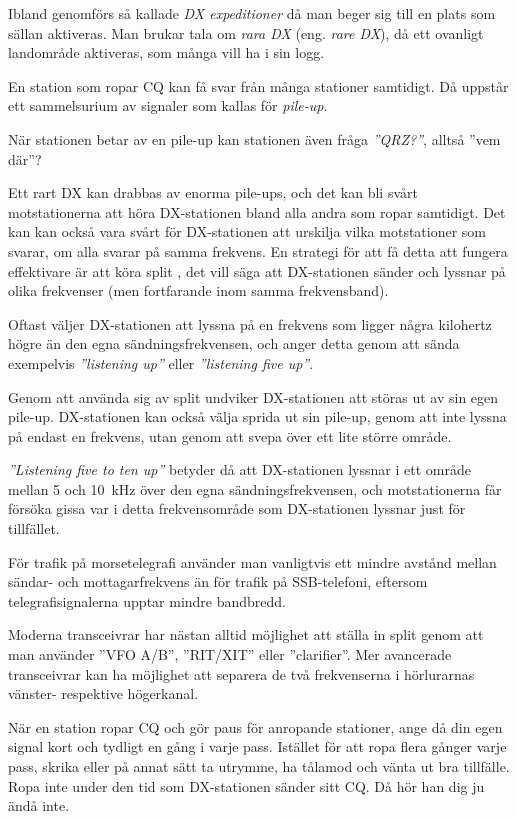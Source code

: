Ibland genomförs så kallade \emph{DX expeditioner} då man beger sig till en
plats som sällan aktiveras.
Man brukar tala om \emph{rara DX} (eng. \emph{rare DX}), då ett ovanligt
landområde aktiveras, som många vill ha i sin logg.

En station som ropar CQ kan få svar från många stationer samtidigt.
Då uppstår ett sammelsurium av signaler som kallas för \emph{pile-up}.

När stationen betar av en pile-up kan stationen även fråga \emph{''QRZ?''},
alltså ''vem där''?

Ett rart DX kan drabbas av enorma pile-ups, och det kan bli svårt
motstationerna att höra DX-stationen bland alla andra som ropar samtidigt.
Det kan kan också vara svårt för DX-stationen att urskilja vilka motstationer
som svarar, om alla svarar på samma frekvens.
En strategi för att få detta att fungera effektivare är att köra split
\cite{LowBandDX}, det vill säga att DX-stationen sänder och lyssnar på olika
frekvenser (men fortfarande inom samma frekvensband).

Oftast väljer DX-stationen att lyssna på en frekvens som ligger några kilohertz
högre än den egna sändningsfrekvensen, och anger detta genom att sända
exempelvis \emph{''listening up''} eller \emph{''listening five up''}.

Genom att använda sig av split undviker DX-stationen att störas ut av sin egen
pile-up.
DX-stationen kan också välja sprida ut sin pile-up, genom att inte lyssna på
endast en frekvens, utan genom att svepa över ett lite större område.

\emph{''Listening five to ten up''} betyder då att DX-stationen lyssnar i ett
område mellan 5 och 10~kHz över den egna sändningsfrekvensen, och
motstationerna får försöka gissa var i detta frekvensområde som DX-stationen
lyssnar just för tillfället.

För trafik på morsetelegrafi använder man vanligtvis ett mindre avstånd mellan
sändar- och mottagarfrekvens än för trafik på SSB-telefoni, eftersom
telegrafisignalerna upptar mindre bandbredd.

Moderna transceivrar har nästan alltid möjlighet att ställa in split genom att
man använder ''VFO A/B'', ''RIT/XIT'' eller ''clarifier''.
Mer avancerade transceivrar kan ha möjlighet att separera de två frekvenserna i
hörlurarnas vänster- respektive högerkanal.

När en station ropar CQ och gör paus för anropande stationer, ange då din egen
signal kort och tydligt en gång i varje pass.
Istället för att ropa flera gånger varje pass, skrika eller på annat sätt
ta utrymme, ha tålamod och vänta ut bra tillfälle.
Ropa inte under den tid som DX-stationen sänder sitt CQ. Då hör han dig ju ändå inte.


